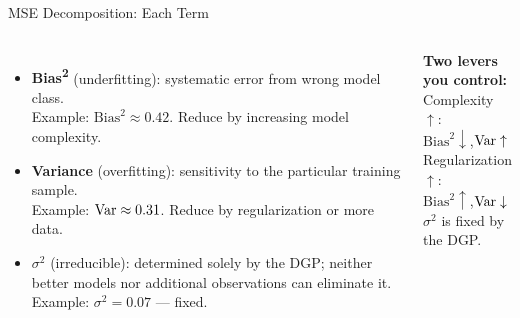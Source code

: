 \documentclass[aspectratio=169, 11pt]{beamer}
\begin{document}
\begin{frame}{MSE Decomposition: Each Term}
  \begin{columns}[T]
      \begin{itemize}\small
        \item \textbf{Bias\textsuperscript{2}} (underfitting): systematic
              error from wrong model class.\\
              {\footnotesize Example: $\text{Bias}^2 \approx 0.42$. Reduce by
              increasing model complexity.}
        \item \textbf{Variance} (overfitting): sensitivity to the
              particular training sample.\\
              {\footnotesize Example: $\operatorname{Var} \approx 0.31$. Reduce by
              regularization or more data.}
        \item \textbf{$\sigma^2$} (irreducible): determined solely by the
              DGP; neither better models nor additional observations
              can eliminate it.\\
              {\footnotesize Example: $\sigma^2 = 0.07$ --- fixed.}
      \end{itemize}
      \begin{keybox}
        {\small \textbf{Two levers you control:}\\[3pt]
        Complexity $\uparrow$:\\
        \hspace{0.5em}$\text{Bias}^2 \downarrow$,\;$\operatorname{Var} \uparrow$\\[3pt]
        Regularization $\uparrow$:\\
        \hspace{0.5em}$\text{Bias}^2 \uparrow$,\;$\operatorname{Var} \downarrow$\\[5pt]
        $\sigma^2$ is fixed by the DGP.}
      \end{keybox}
  \end{columns}
\end{frame}
\end{document}
